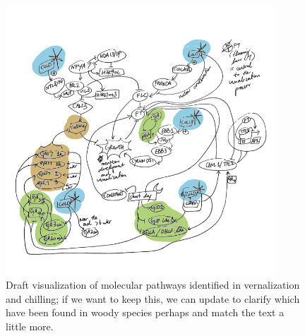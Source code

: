 \documentclass[11pt]{article}
\begin{document}
\begin{figure}[h!]
\includegraphics[width=0.9\textwidth]{..//figures/biochemicalModelSketch.png}
\caption{Draft visualization of molecular pathways identified in vernalization and chilling; if we want to keep this, we can update to clarify which have been found in woody species perhaps and match the text a little more.} 
\label{fig:molecular}
\end{figure}
\end{document}
